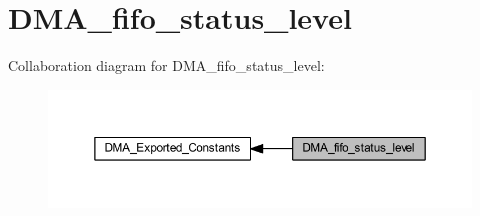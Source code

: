\hypertarget{group___d_m_a__fifo__status__level}{}\section{D\+M\+A\+\_\+fifo\+\_\+status\+\_\+level}
\label{group___d_m_a__fifo__status__level}
Collaboration diagram for D\+M\+A\+\_\+fifo\+\_\+status\+\_\+level\+:
\nopagebreak
\begin{figure}[H]
\begin{center}
\leavevmode
\includegraphics[width=350pt]{group___d_m_a__fifo__status__level}
\end{center}
\end{figure}
